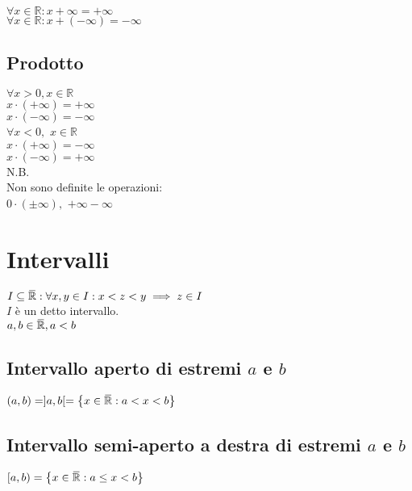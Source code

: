 \documentclass[a4paper, twoside, italian, 11pt]{book}
\newcommand{\braces}[1] {\left\{#1\right\}}
\newcommand{\overbar}[1]{\mkern 1.5mu\overline{\mkern-1.5mu#1\mkern-1.5mu}\mkern 1.5mu}
\newcommand{\R}{\mathbb{R}}
\begin{document}
\noindent
$\forall x \in \R: x + \infty = +\infty$ \\
$\forall x \in \R: x + (-\infty) = -\infty$


\subsection{Prodotto}

\noindent
$\forall x > 0, x \in \R$ \\
$x \cdot (+\infty) = +\infty$ \\
$x \cdot (-\infty) = -\infty$ \\


\noindent
$\forall x < 0,$ $x \in \R$ \\
$x \cdot (+\infty) = -\infty$ \\
$x \cdot (-\infty) = +\infty$ \\

\noindent
N.B. \\
Non sono definite le operazioni: \\
$0 \cdot (\pm \infty),$ $+ \infty - \infty$



\section{Intervalli}

\noindent
$I \subseteq \overbar \R : \forall x, y \in I : x < z < y \implies z \in I$ \\
$I$ è un detto intervallo. \\

\noindent
$a, b \in \overbar \R, a < b$ \\


\subsection{Intervallo aperto di estremi $a$ e $b$}

\noindent
$(a, b) = ]a, b[ = \braces{ x \in \overbar \R : a < x < b}$ \\


\subsection{Intervallo semi-aperto a destra di estremi $a$ e $b$}

\noindent
$[a, b) = \braces{ x \in \overbar \R : a \leq x < b}$ \\
\end{document}
